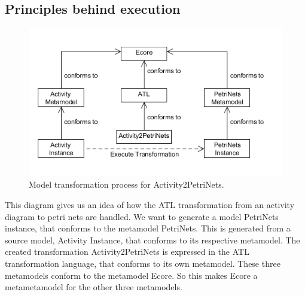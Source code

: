 \documentclass[pdftex,11pt,a4paper]{article}
\begin{document}
\subsection{Principles behind execution}

\begin{figure}[H]
	\centering
	\includegraphics[scale=0.5]{figures/ATL.png}
	\caption{Model transformation process for Activity2PetriNets.}
	\label{fig:ATL}
\end{figure}

This diagram gives us an idea of how the ATL transformation from an activity
diagram to petri nets are handled. We want to generate a model PetriNets
instance, that conforms to the metamodel PetriNets. This is generated from a
source model, Activity Instance, that conforms to its respective metamodel.
The created transformation Activity2PetriNets is expressed in the ATL
transformation  language, that conforms to its own metamodel. These three
metamodels conform to the metamodel Ecore. So this makes Ecore a metametamodel
for the other three metamodels. 
\end{document}
